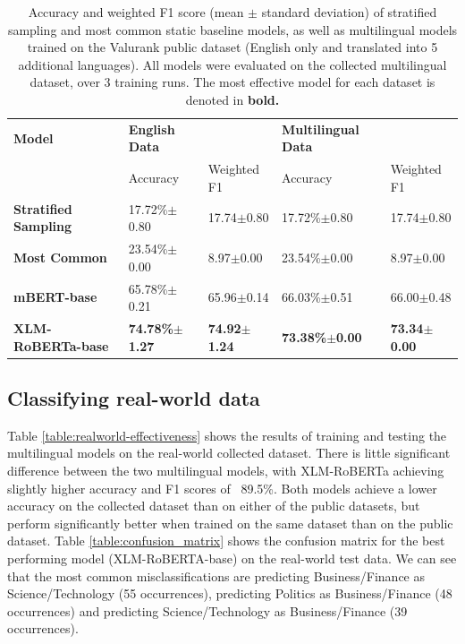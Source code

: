 \documentclass{l4proj}
\begin{document}
\begin{table}[]
\begin{tabular}{lllll}
\hline
\textbf{Model}               & \textbf{English Data} &             & \textbf{Multilingual Data} &             \\ \cline{2-5} 
                             & Accuracy              & Weighted F1 & Accuracy                   & Weighted F1 \\ \hline
\textbf{Stratified Sampling} & 17.72\%$\pm$0.80     & 17.74$\pm$0.80 & 17.72\%$\pm$0.80     & 17.74$\pm$0.80            \\
\textbf{Most Common}         & 23.54\%$\pm$0.00     & 8.97$\pm$0.00 & 23.54\%$\pm$0.00     & 8.97$\pm$0.00 \\ \hline
\textbf{mBERT-base}          & 65.78\%$\pm$0.21     & 65.96$\pm$0.14         & 66.03\%$\pm$0.51        & 66.00$\pm$0.48         \\
\textbf{XLM-RoBERTa-base}    & \textbf{74.78\%$\pm$1.27}  & \textbf{74.92$\pm$1.24}        & \textbf{73.38\%$\pm$0.00}   & \textbf{73.34$\pm$0.00}        \\ \hline
\end{tabular}
\caption{Accuracy and weighted F1 score (mean $\pm$ standard deviation) of stratified sampling and most common static baseline models, as well as multilingual models trained on the Valurank public dataset (English only and translated into 5 additional languages). All models were evaluated on the collected multilingual dataset, over 3 training runs. The most effective model for each dataset is denoted in \textbf{bold.}}
\label{table:transferability}
\end{table}

\subsection{Classifying real-world data}

Table \ref{table:realworld-effectiveness} shows the results of training and testing the multilingual models on the real-world collected dataset. There is little significant difference between the two multilingual models, with XLM-RoBERTa achieving slightly higher accuracy and F1 scores of ~89.5\%. Both models achieve a lower accuracy on the collected dataset than on either of the public datasets, but perform significantly better when trained on the same dataset than on the public dataset.
Table \ref{table:confusion_matrix} shows the confusion matrix for the best performing model (XLM-RoBERTA-base) on the real-world test data. We can see that the most common misclassifications are predicting Business/Finance as Science/Technology (55 occurrences), predicting Politics as Business/Finance (48 occurrences) and predicting Science/Technology as Business/Finance (39 occurrences).  
\end{document}

